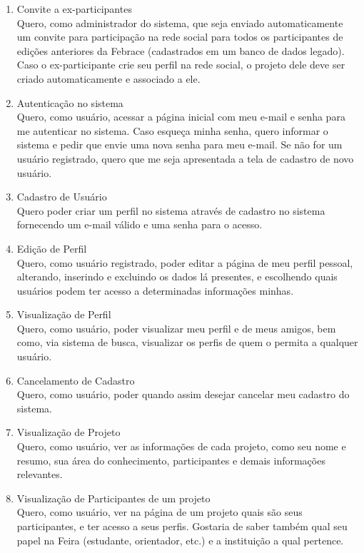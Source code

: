     \begin{enumerate}
      \item Convite a ex-participantes \\
        Quero, como administrador do sistema, que seja enviado automaticamente um convite para participação na rede social para todos os participantes de edições anteriores da Febrace (cadastrados em um banco de dados legado). Caso o ex-participante crie seu perfil na rede social, o projeto dele deve ser criado automaticamente e associado a ele.
      \item Autenticação no sistema \\
        Quero, como usuário, acessar a página inicial com meu e-mail e senha para me autenticar no sistema. Caso esqueça minha senha, quero informar o sistema e pedir que envie uma nova senha para meu e-mail. Se não for um usuário registrado, quero que me seja apresentada a tela de cadastro de novo usuário.
      \item Cadastro de Usuário \\
        Quero poder criar um perfil no sistema através de cadastro no sistema fornecendo um e-mail válido e uma senha para o acesso.
      \item Edição de Perfil \\
        Quero, como usuário registrado, poder editar a página de meu perfil pessoal, alterando, inserindo e excluindo os dados lá presentes, e escolhendo quais usuários podem ter acesso a determinadas informações minhas.
      \item Visualização de Perfil \\
        Quero, como usuário, poder visualizar meu perfil e de meus amigos, bem como, via sistema de busca, visualizar os perfis de quem o permita a qualquer usuário.
      \item Cancelamento de Cadastro \\
        Quero, como usuário, poder quando assim desejar cancelar meu cadastro do sistema.
      \item Visualização de Projeto \\
        Quero, como usuário, ver as informações de cada projeto, como seu nome e resumo, sua área do conhecimento, participantes e demais informações relevantes.
      \item Visualização de Participantes de um projeto \\
        Quero, como usuário, ver na página de um projeto quais são seus participantes, e ter acesso a seus perfis. Gostaria de saber também qual seu papel na Feira (estudante, orientador, etc.) e a instituição a qual pertence.

\end{enumerate}
